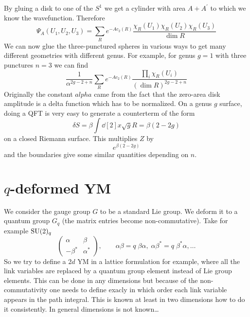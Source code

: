 By gluing a disk to one of the $S^1$ we get a cylinder with area $A+A^\prime$ to which we know the wavefunction. Therefore 
\begin{equation}
	\Psi_A(U_1,U_2,U_3)=\sum_R e^{-A c_2(R)}\frac{\chi_R(U_1)\chi_R(U_2)\chi_R(U_3)}{\dim R}
\end{equation}
We can now glue the three-punctured spheres in various ways to get many different geometries with different genus. For example, for genus $g=1$ with three punctures $n=3$ we can find 
\begin{equation}
	\frac{1}{\alpha^{2g-2+n}}\sum_R e^{-A c_2(R)}\frac{\prod_i \chi_R(U_i)}{(\dim R)^{2g-2+n}}
\end{equation}
Originally the constant $alpha$ came from the fact that the zero-area disk amplitude is a delta function which has to be normalized. On a genus $g$ surface, doing a QFT is very easy to generate a counterterm of the form 
\begin{equation}
	\delta S=\beta\int \dd[2]{x}\sqrt{g}R=\beta (2-2g)
\end{equation}
on a closed Riemann surface. This multiplies $Z$ by 
\begin{equation}
	e^{\beta(2-2g)}
\end{equation}
and the boundaries give some similar quantities depending on $n$. 

\section{$q$-deformed YM}
We consider the gauge group $G$ to be a standard Lie group. We deform it to a quantum group $G_q$ (the matrix entries become non-commutative). Take for example $\mathrm{SU}(2)_q$
\begin{equation}
	\begin{pmatrix}
		\alpha&\beta\\
		-\beta^*&\alpha^*
	\end{pmatrix},\qquad \alpha\beta=q\;\beta\alpha,\; \alpha\beta^*=q\;\beta^*\alpha,\ldots
\end{equation}
So we try to define a $2d$ YM in a lattice formulation for example, where all the link variables are replaced by a quantum group element instead of Lie group elements. This can be done in any dimensions but because of the non-commutativity one needs to define exacly in which order each link variable appears in the path integral. This is known at least in two dimensions how to do it consistently. In general dimensions is not known\dots

